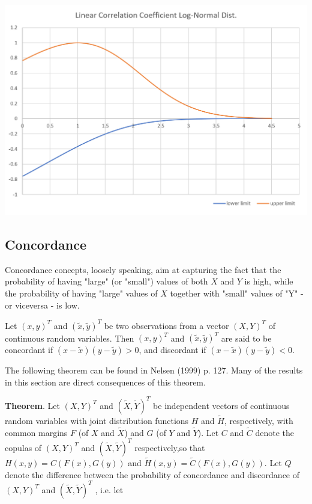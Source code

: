 \documentclass{article}
\begin{document}
\includegraphics[scale=.75]{fig/linear_correlation_lognormal.png} 

\subsection{Concordance}

Concordance concepts, loosely speaking, aim at capturing the fact that the probability of having "large" (or "small") values of both $X$ and $Y$ is high, while the probability of having "large" values of $X$ together with "small" values of "Y" - or viceversa - is low.


Let $(x, y)^T$ and $(\tilde x, \tilde y)^T$ be two observations from a vector $(X, Y )^T$ of continuous random variables. Then $(x, y)^T$ and $(\tilde x, \tilde y)^T$ are said to be concordant if $(x-\tilde x)(y-\tilde y) > 0$, and discordant if $(x-\tilde x)(y-\tilde y) < 0$.


The following theorem can be found in Nelsen (1999) p. 127. Many of the results in this section are direct consequences of this theorem.

\textbf{Theorem}. Let $(X, Y )^T$ and $(\tilde X, \tilde Y )^T$ be independent vectors of continuous random variables with joint distribution functions $H$ and $\tilde H$, respectively, with common margins $F$ (of $X$ and $\tilde X$) and $G$ (of $Y$ and $\tilde Y$). Let $C$ and $\tilde C$ denote the copulas of $(X, Y )^T$ and $(\tilde X, \tilde Y )^T$ respectively,so that $H(x,y)=C(F(x),G(y))$ and $\tilde H(x,y)= \tilde C(F(x),G(y))$. Let $Q$ denote the difference between the probability of concordance and discordance of $(X, Y )^T$ and $(\tilde X, \tilde Y )^T$ , i.e. let
\end{document}
